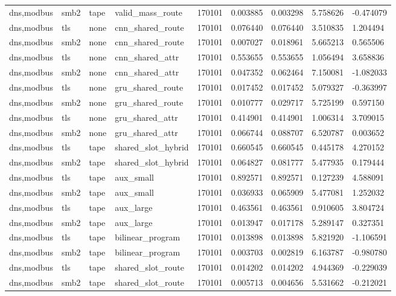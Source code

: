 \begin{tabular}{lllllllll}
dns,modbus & smb2 & tape & valid\_mass\_route & 170101 & 0.003885 & 0.003298 & 5.758626 & -0.474079 \\
dns,modbus & tls & none & cnn\_shared\_route & 170101 & 0.076440 & 0.076440 & 3.510835 & 1.204494 \\
dns,modbus & smb2 & none & cnn\_shared\_route & 170101 & 0.007027 & 0.018961 & 5.665213 & 0.565506 \\
dns,modbus & tls & none & cnn\_shared\_attr & 170101 & 0.553655 & 0.553655 & 1.056494 & 3.658836 \\
dns,modbus & smb2 & none & cnn\_shared\_attr & 170101 & 0.047352 & 0.062464 & 7.150081 & -1.082033 \\
dns,modbus & tls & none & gru\_shared\_route & 170101 & 0.017452 & 0.017452 & 5.079327 & -0.363997 \\
dns,modbus & smb2 & none & gru\_shared\_route & 170101 & 0.010777 & 0.029717 & 5.725199 & 0.597150 \\
dns,modbus & tls & none & gru\_shared\_attr & 170101 & 0.414901 & 0.414901 & 1.006314 & 3.709015 \\
dns,modbus & smb2 & none & gru\_shared\_attr & 170101 & 0.066744 & 0.088707 & 6.520787 & 0.003652 \\
dns,modbus & tls & tape & shared\_slot\_hybrid & 170101 & 0.660545 & 0.660545 & 0.445178 & 4.270152 \\
dns,modbus & smb2 & tape & shared\_slot\_hybrid & 170101 & 0.064827 & 0.081777 & 5.477935 & 0.179444 \\
dns,modbus & tls & tape & aux\_small & 170101 & 0.892571 & 0.892571 & 0.127239 & 4.588091 \\
dns,modbus & smb2 & tape & aux\_small & 170101 & 0.036933 & 0.065909 & 5.477081 & 1.252032 \\
dns,modbus & tls & tape & aux\_large & 170101 & 0.463561 & 0.463561 & 0.910605 & 3.804724 \\
dns,modbus & smb2 & tape & aux\_large & 170101 & 0.013947 & 0.017178 & 5.289147 & 0.327351 \\
dns,modbus & tls & tape & bilinear\_program & 170101 & 0.013898 & 0.013898 & 5.821920 & -1.106591 \\
dns,modbus & smb2 & tape & bilinear\_program & 170101 & 0.003703 & 0.002819 & 6.163787 & -0.980780 \\
dns,modbus & tls & tape & shared\_slot\_route & 170101 & 0.014202 & 0.014202 & 4.944369 & -0.229039 \\
dns,modbus & smb2 & tape & shared\_slot\_route & 170101 & 0.005713 & 0.004656 & 5.531662 & -0.212021 \\

\end{tabular}
